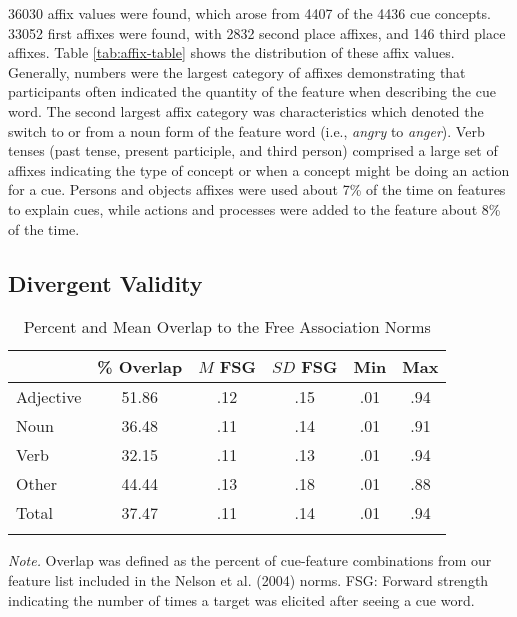 \documentclass[english,,man]{apa6}
\theoremstyle{definition}
\theoremstyle{definition}
\theoremstyle{definition}
\theoremstyle{remark}
\begin{document}
36030 affix values were found, which arose from 4407 of the 4436 cue
concepts. 33052 first affixes were found, with 2832 second place
affixes, and 146 third place affixes. Table \ref{tab:affix-table} shows
the distribution of these affix values. Generally, numbers were the
largest category of affixes demonstrating that participants often
indicated the quantity of the feature when describing the cue word. The
second largest affix category was characteristics which denoted the
switch to or from a noun form of the feature word (i.e., \emph{angry} to
\emph{anger}). Verb tenses (past tense, present participle, and third
person) comprised a large set of affixes indicating the type of concept
or when a concept might be doing an action for a cue. Persons and
objects affixes were used about 7\% of the time on features to explain
cues, while actions and processes were added to the feature about 8\% of
the time.

\hypertarget{divergent-validity}{%
\subsection{Divergent Validity}\label{divergent-validity}}

\begin{table}[tbp]
\begin{center}
\begin{threeparttable}
\caption{\label{tab:divergent-table}Percent and Mean Overlap to the Free Association Norms}
\begin{tabular}{lccccc}
\toprule
  & \% Overlap & $M$ FSG & $SD$ FSG & Min & Max\\
\midrule
Adjective & 51.86 & .12 & .15 & .01 & .94\\
Noun & 36.48 & .11 & .14 & .01 & .91\\
Verb & 32.15 & .11 & .13 & .01 & .94\\
Other & 44.44 & .13 & .18 & .01 & .88\\
Total & 37.47 & .11 & .14 & .01 & .94\\
\bottomrule
\addlinespace
\end{tabular}
\begin{tablenotes}[para]
\normalsize{\textit{Note.} Overlap was defined as the percent of cue-feature combinations from our feature list included in the Nelson et al. (2004) norms. FSG: Forward strength indicating the number of times a target was elicited after seeing a cue word.}
\end{tablenotes}
\end{threeparttable}
\end{center}
\end{table}
\end{document}
